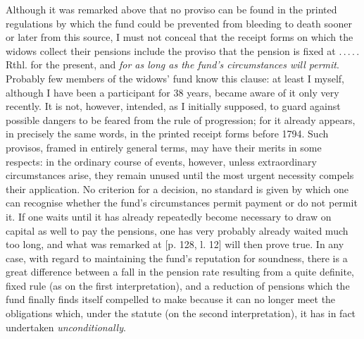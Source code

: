 Although it was remarked above that no proviso can be found in the printed regulations by which the fund could be prevented from bleeding to death sooner or later from this source, I must not conceal that the receipt forms on which the widows collect their pensions include the proviso that the pension is fixed at .\,.\,.\,.\,. Rthl. for the present, and \textit{for as long as the fund's circumstances will permit}. Probably few members of the widows' fund know this clause: at least I myself, although I have been a participant for 38 years, became aware of it only very recently. It is not, however, intended, as I initially supposed, to guard against possible dangers to be feared from the rule of progression; for it already appears, in precisely the same words, in the printed receipt forms before 1794. Such provisos, framed in entirely general terms, may have their merits in some respects: in the ordinary course of events, however, unless extraordinary circumstances arise, they remain unused until the most urgent necessity compels their application. No criterion for a decision, no standard is given by which one can recognise whether the fund's circumstances permit payment or do not permit it. If one waits until it has already repeatedly become necessary to draw on capital as well to pay the pensions, one has very probably already waited much too long, and what was remarked at [p. 128, l. 12] will then prove true. In any case, with regard to maintaining the fund's reputation for soundness, there is a great difference between a fall in the pension rate resulting from a quite definite, fixed rule (as on the first interpretation), and a reduction of pensions which the fund finally finds itself compelled to make because it can no longer meet the obligations which, under the
statute (on the second interpretation), it has in fact undertaken \textit{unconditionally}.

